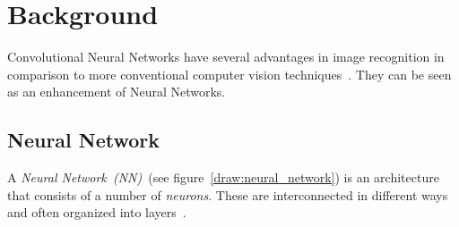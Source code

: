 \chapter{Background}
\label{cha:background}


Convolutional Neural Networks have several advantages in image recognition in comparison to more conventional computer vision techniques~\cite{long2015_FCNs, imageNetWinner2012krizhevsky}.
They can be seen as an enhancement of Neural Networks. 

\section{Neural Network}
\label{nn:general}
A \emph{Neural Network~(NN)}~(see figure~\ref{draw:neural_network}) is an architecture that consists of a number of \emph{neurons}. These are interconnected in different ways and often organized into layers~\cite{neuralnetworks_old1994sarle}. 

